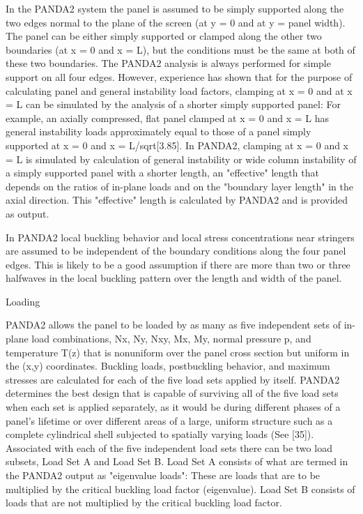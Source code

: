 In the PANDA2 system the panel is assumed to be simply supported along the
two edges normal to the plane of the screen (at y = 0 and at y = panel
width). The panel can be either simply supported or clamped along the
other two boundaries (at x = 0 and x = L), but the conditions must be the
same at both of these two boundaries.  The PANDA2 analysis is always
performed for simple support on all four edges. However, experience has
shown that for the purpose of calculating panel and general instability
load factors, clamping at x = 0 and at x = L can be simulated by the
analysis of a shorter simply supported panel: For example, an axially
compressed, flat panel clamped at x = 0 and x = L has general instability
loads approximately equal to those of a panel simply supported at x = 0
and x = L/sqrt[3.85]. In PANDA2, clamping at x = 0 and x = L is simulated
by calculation of general instability or wide column instability of a
simply supported panel with a shorter length, an "effective" length that
depends on the ratios of in-plane loads and on the "boundary layer length"
in the axial direction. This "effective" length is calculated by PANDA2
and is provided as output. 

In PANDA2 local buckling behavior and local stress concentrations near
stringers are assumed to be independent of the boundary conditions along
the four panel edges.  This is likely to be a good assumption if there are
more than two or three halfwaves in the local buckling pattern over the
length and width of the panel. 


Loading

PANDA2 allows the panel to be loaded by as many as five independent sets
of in-plane load combinations, Nx, Ny, Nxy, Mx, My, normal pressure p, and
temperature T(z) that is nonuniform over the panel cross section but
uniform in the (x,y) coordinates.  Buckling loads, postbuckling behavior,
and maximum stresses are calculated for each of the five load sets applied
by itself. PANDA2 determines the best design that is capable of surviving
all of the five load sets when each set is applied separately, as it would
be during different phases of a panel's lifetime or over different areas
of a large, uniform structure such as a complete cylindrical shell
subjected to spatially varying loads (See [35]). Associated with each of
the five independent load sets there can be two load subsets, Load Set A
and Load Set B. Load Set A consists of what are termed in the PANDA2
output as "eigenvalue loads": These are loads that are to be multiplied by
the critical buckling load factor (eigenvalue). Load Set B consists of
loads that are not multiplied by the critical buckling load factor. 


